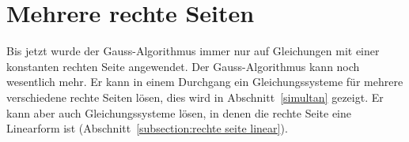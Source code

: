 %
%
%
\section{Mehrere rechte Seiten\label{section:mehrere rechte seiten}}
Bis jetzt wurde der Gauss-Algorithmus immer nur auf Gleichungen mit
einer konstanten rechten Seite angewendet.
Der Gauss-Algorithmus kann noch wesentlich mehr.
Er kann in einem Durchgang ein Gleichungssysteme für mehrere verschiedene
rechte Seiten lösen, dies wird in Abschnitt~\ref{simultan} gezeigt.
Er kann aber auch Gleichungssysteme lösen, in denen die rechte
Seite eine Linearform ist (Abschnitt~\ref{subsection:rechte seite linear}).

%
%
